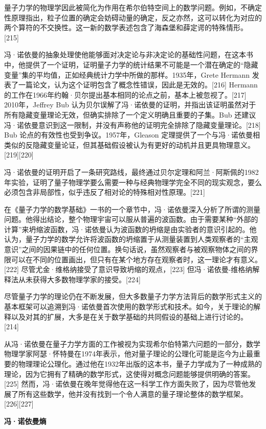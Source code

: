 量子力学的物理学因此被简化为作用在希尔伯特空间上的数学问题。例如，不确定性原理指出，粒子位置的确定会妨碍动量的确定，反之亦然，这可以转化为对应的两个算符的不交换性。这一新的数学表述包含了海森堡和薛定谔的特殊情形。[215]

冯·诺依曼的抽象处理使他能够面对决定论与非决定论的基础性问题，在这本书中，他提供了一个证明，证明量子力学的统计结果不可能是一个潜在确定的“隐藏变量”集的平均值，正如经典统计力学中所做的那样。1935年，Grete Hermann 发表了一篇论文，认为这个证明包含了概念性错误，因此是无效的。[216] Hermann 的工作在1966年约翰·贝尔提出基本相同的论点之前，基本上被忽视了。[217] 2010年，Jeffrey Bub 认为贝尔误解了冯·诺依曼的证明，并指出该证明虽然对于所有隐藏变量理论无效，但确实排除了一个定义明确且重要的子集。Bub 还建议冯·诺依曼意识到这一限制，并没有声称他的证明完全排除了隐藏变量理论。[218] Bub 论点的有效性也受到争议。1957年，Gleason 定理提供了一个与冯·诺依曼相类似的反隐藏变量论证，但其基础假设被认为有更好的动机并且更具物理意义。[219][220]

冯·诺依曼的证明开启了一条研究路线，最终通过贝尔定理和阿兰·阿斯佩的1982年实验，证明了量子物理学要么需要一种与经典物理学完全不同的现实观念，要么必须包含非局部性，似乎违反了相对论的特殊相对性原理。[221]

在《量子力学的数学基础》一书的一个章节中，冯·诺依曼深入分析了所谓的测量问题。他得出结论，整个物理宇宙可以服从普遍的波函数。由于需要某种“外部的计算”来坍缩波函数，冯·诺依曼认为波函数的坍缩是由实验者的意识引起的。他认为，量子力学的数学允许将波函数的坍缩置于从测量装置到人类观察者的“主观意识”之间的因果链中的任何位置。换句话说，虽然观察者与被观察物体之间的界限可以在不同的位置画出，但只有在某个地方存在观察者时，这一理论才有意义。[222] 尽管尤金·维格纳接受了意识导致坍缩的观点，[223] 但冯·诺依曼-维格纳解释法从未获得大多数物理学家的接受。[224]

尽管量子力学的理论仍在不断发展，但大多数量子力学方法背后的数学形式主义的基本框架可以追溯到冯·诺依曼首次使用的数学形式和技术。如今，关于理论的解释以及对其的扩展，大多是在关于数学基础的共同假设的基础上进行讨论的。[214]

从冯·诺依曼在量子力学方面的工作被视为实现希尔伯特第六问题的一部分，数学物理学家阿瑟·怀特曼在1974年表示，他对量子理论的公理化可能是迄今为止最重要的物理理论公理化。通过他在1932年出版的这本书，量子力学成为了一种成熟的理论，因为它拥有了精确的数学形式，这使得对概念问题能够提供明确的答案。[225] 然而，冯·诺依曼在晚年觉得他在这一科学工作方面失败了，因为尽管他发展了所有这些数学，他并没有找到一个令人满意的量子理论整体的数学框架。[226][227]

\textbf{冯·诺依曼熵}  

